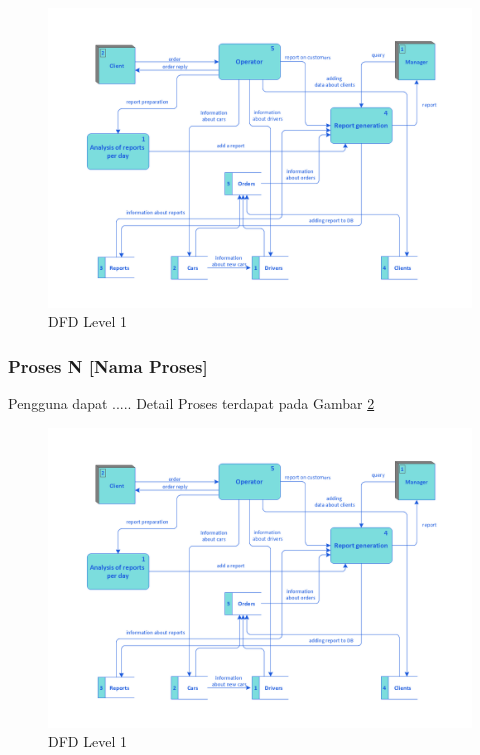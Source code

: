       \begin{figure}[htp]
        \centering
        \includegraphics[width=\linewidth]{images/bab3/Taxi-service-dfd.png}
        \caption{DFD Level 1}
        \label{dfd1a}
      \end{figure}
      
  \subsubsection{Proses N [Nama Proses]}
  Pengguna dapat ..... Detail Proses terdapat pada Gambar \ref{dfd1n}
      \begin{figure}[H]
        \centering
        \includegraphics[width=\linewidth]{images/bab3/Taxi-service-dfd.png}
        \caption{DFD Level 1}
        \label{dfd1n}
      \end{figure}
  
